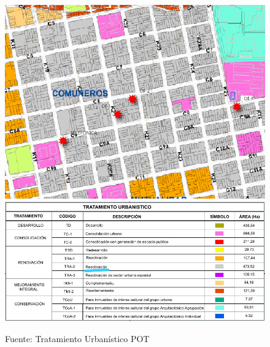\documentclass[12pt,a4paper,twoside]{article}
\begin{document}
{%

\begin{figure}[!h]
	\centering
	\includegraphics[width=\textwidth]{Norma/Tratamiento}
	\includegraphics[width=\textwidth]{Norma/TratamientoL}
	\caption{Fuente: Tratamiento Urbanístico POT}
	\label{fig:tratamiento}
\end{figure}

}
\end{document}
